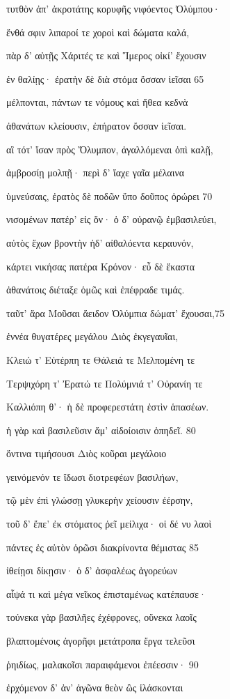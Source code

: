 τυτθὸν ἀπ' ἀκροτάτης κορυφῆς νιφόεντος Ὀλύμπου·

ἔνθά σφιν λιπαροί τε χοροὶ καὶ δώματα καλά,

πὰρ δ' αὐτῇς Χάριτές τε καὶ Ἵμερος οἰκί' ἔχουσιν

ἐν θαλίῃς· ἐρατὴν δὲ διὰ στόμα ὄσσαν ἱεῖσαι \num{65} 

μέλπονται, πάντων τε νόμους καὶ ἤθεα κεδνὰ 

ἀθανάτων κλείουσιν, ἐπήρατον ὄσσαν ἱεῖσαι.

αἳ τότ' ἴσαν πρὸς Ὄλυμπον, ἀγαλλόμεναι ὀπὶ καλῇ, 

ἀμβροσίῃ μολπῇ· περὶ δ' ἴαχε γαῖα μέλαινα 

ὑμνεύσαις, ἐρατὸς δὲ ποδῶν ὕπο δοῦπος ὀρώρει \num{70}

νισομένων πατέρ' εἰς ὅν· ὁ δ' οὐρανῷ ἐμβασιλεύει, 

αὐτὸς ἔχων βροντὴν ἠδ' αἰθαλόεντα κεραυνόν,

κάρτει νικήσας πατέρα Κρόνον· εὖ δὲ ἕκαστα 

ἀθανάτοις διέταξε ὁμῶς καὶ ἐπέφραδε τιμάς.

ταῦτ' ἄρα Μοῦσαι ἄειδον Ὀλύμπια δώματ' ἔχουσαι,\num{75} 

ἐννέα θυγατέρες μεγάλου Διὸς ἐκγεγαυῖαι,

Κλειώ τ' Εὐτέρπη τε Θάλειά τε Μελπομένη τε

Τερψιχόρη τ' Ἐρατώ τε Πολύμνιά τ' Οὐρανίη τε

Καλλιόπη θ'· ἡ δὲ προφερεστάτη ἐστὶν ἁπασέων. 

ἡ γὰρ καὶ βασιλεῦσιν ἅμ' αἰδοίοισιν ὀπηδεῖ. \num{80} 

ὅντινα τιμήσουσι Διὸς κοῦραι μεγάλοιο

γεινόμενόν τε ἴδωσι διοτρεφέων βασιλήων,

τῷ μὲν ἐπὶ γλώσσῃ γλυκερὴν χείουσιν ἐέρσην,

τοῦ δ' ἔπε' ἐκ στόματος ῥεῖ μείλιχα· οἱ δέ νυ λαοὶ 

πάντες ἐς αὐτὸν ὁρῶσι διακρίνοντα θέμιστας \num{85}

ἰθείῃσι δίκῃσιν· ὁ δ' ἀσφαλέως ἀγορεύων

αἶψά τι καὶ μέγα νεῖκος ἐπισταμένως κατέπαυσε· 

τούνεκα γὰρ βασιλῆες ἐχέφρονες, οὕνεκα λαοῖς 

βλαπτομένοις ἀγορῆφι μετάτροπα ἔργα τελεῦσι

ῥηιδίως, μαλακοῖσι παραιφάμενοι ἐπέεσσιν· \num{90} 

ἐρχόμενον δ' ἀν' ἀγῶνα θεὸν ὣς ἱλάσκονται


